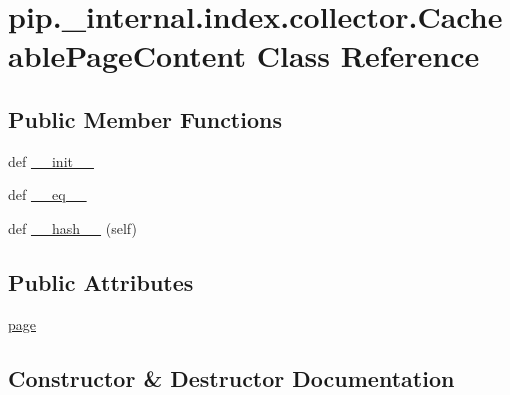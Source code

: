 \hypertarget{classpip_1_1__internal_1_1index_1_1collector_1_1CacheablePageContent}{}\section{pip.\+\_\+internal.\+index.\+collector.\+Cacheable\+Page\+Content Class Reference}
\label{classpip_1_1__internal_1_1index_1_1collector_1_1CacheablePageContent}
\subsection*{Public Member Functions}
\begin{DoxyCompactItemize}
\item 
def \hyperlink{classpip_1_1__internal_1_1index_1_1collector_1_1CacheablePageContent_aa46e224a6f70c3027078707b106c32b9}{\+\_\+\+\_\+init\+\_\+\+\_\+}
\item 
def \hyperlink{classpip_1_1__internal_1_1index_1_1collector_1_1CacheablePageContent_af7bcab730b9f9cccf13bcb4c47269081}{\+\_\+\+\_\+eq\+\_\+\+\_\+}
\item 
def \hyperlink{classpip_1_1__internal_1_1index_1_1collector_1_1CacheablePageContent_a3218d658140b896bad61771f6a356994}{\+\_\+\+\_\+hash\+\_\+\+\_\+} (self)
\end{DoxyCompactItemize}
\subsection*{Public Attributes}
\begin{DoxyCompactItemize}
\item 
\hyperlink{classpip_1_1__internal_1_1index_1_1collector_1_1CacheablePageContent_aef8a7d606e4a405afbd2b8cfcac6e702}{page}
\end{DoxyCompactItemize}


\subsection{Constructor \& Destructor Documentation}
\mbox{\label{classpip_1_1__internal_1_1index_1_1collector_1_1CacheablePageContent_aa46e224a6f70c3027078707b106c32b9}} 
